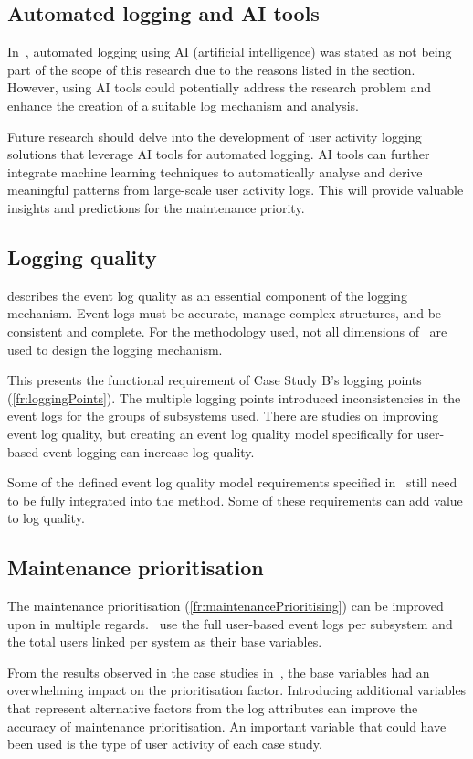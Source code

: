\subsection{Automated logging and AI tools}
In~, automated logging using AI (artificial intelligence) was stated as not being part of the scope of this research due to the reasons listed in the section. However, using AI tools could potentially address the research problem and enhance the creation of a suitable log mechanism and analysis. \par Future research should delve into the development of user activity logging solutions that leverage AI tools for automated logging. AI tools can further integrate machine learning techniques to automatically analyse and derive meaningful patterns from large-scale user activity logs. This will provide valuable insights and predictions for the maintenance priority. 

\subsection{Logging quality}
 describes the event log quality as an essential component of the logging mechanism. Event logs must be accurate, manage complex structures, and be consistent and complete. For the methodology used, not all dimensions of~ are used to design the logging mechanism.\par This presents the functional requirement of Case Study B's logging points (\ref{fr:loggingPoints}). The multiple logging points introduced inconsistencies in the event logs for the groups of subsystems used. There are studies on improving event log quality, but creating an event log quality model specifically for user-based event logging can increase log quality. \par Some of the defined event log quality model requirements specified in~ still need to be fully integrated into the method. Some of these requirements can add value to log quality.

\subsection{Maintenance prioritisation}
The maintenance prioritisation (\ref{fr:maintenancePrioritising}) can be improved upon in multiple regards.~ use the full user-based event logs per subsystem and the total users linked per system as their base variables. \par From the results observed in the case studies in~, the base variables had an overwhelming impact on the prioritisation factor. Introducing additional variables that represent alternative factors from the log attributes can improve the accuracy of maintenance prioritisation. An important variable that could have been used is the type of user activity of each case study.

